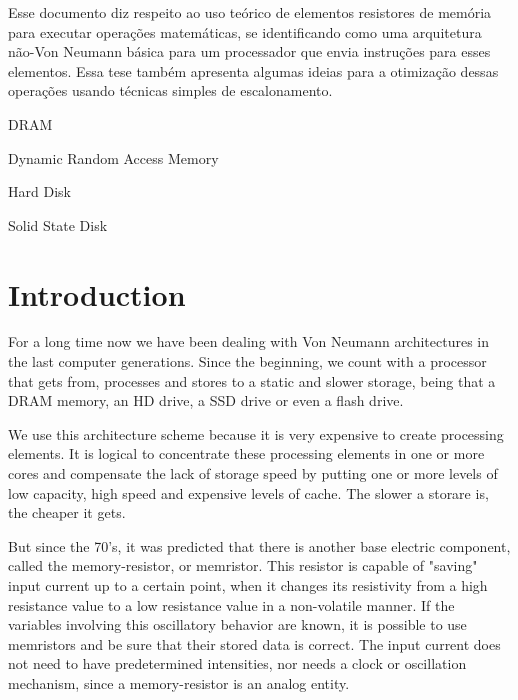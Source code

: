 \documentclass[ecp,tc,english]{iiufrgs}
\begin{document}
\begin{englishabstract}

Esse documento diz respeito ao uso teórico de elementos resistores de memória para executar operações matemáticas, se identificando como uma arquitetura não-Von Neumann básica para um processador que envia instruções para esses elementos. Essa tese também apresenta algumas ideias para a otimização dessas operações usando técnicas simples de escalonamento.

\end{englishabstract}

\begin{listofabbrv}{DRAM}
	\item[DRAM] Dynamic Random Access Memory
	\item[HD] Hard Disk
	\item[SSD] Solid State Disk
\end{listofabbrv}

\listoffigures

\listoftables

\tableofcontents


\chapter{Introduction}
For a long time now we have been dealing with Von Neumann architectures in the last computer generations. Since the beginning, we count with a processor that gets from, processes and stores to a static and slower storage, being that a DRAM memory, an HD drive, a SSD drive or even a flash drive.

We use this architecture scheme because it is very expensive to create processing elements. It is logical to concentrate these processing elements in one or more cores and compensate the lack of storage speed by putting one or more levels of low capacity, high speed and expensive levels of cache. The slower a storare is, the cheaper it gets.

But since the 70's, it was predicted that there is another base electric component, called the memory-resistor, or memristor. This resistor is capable of "saving" input current up to a certain point, when it changes its resistivity from a high resistance value to a low resistance value in a non-volatile manner. If the variables involving this oscillatory behavior are known, it is possible to use memristors and be sure that their stored data is correct. The input current does not need to have predetermined intensities, nor needs a clock or oscillation mechanism, since a memory-resistor is an analog entity.
\end{document}
